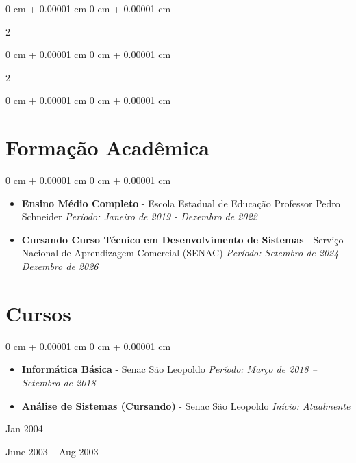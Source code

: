 \documentclass[10pt, letterpaper]{article}
\newenvironment{onecolentry}{
    \begin{adjustwidth}{
        0 cm + 0.00001 cm
    }{
        0 cm + 0.00001 cm
    }
}{
    \end{adjustwidth}
} %
\newenvironment{twocolentry}[2][]{
    \onecolentry
    \def\secondColumn{#2}
    \setcolumnwidth{\fill, 4.5 cm}
    \begin{paracol}{2}
}{
    \switchcolumn \raggedleft \secondColumn
    \end{paracol}
    \endonecolentry
} %
\begin{document}
        \begin{twocolentry}{
            June 2003 – Aug 2003
        }


        \vspace{0.10 cm}



        
        \begin{samepage}
            \begin{twocolentry}{
                Jan 2004
            }
               

            \vspace{0.10 cm}
            
            \begin{onecolentry}

                \vspace{0.10 cm}
                
 \section{Formação Acadêmica}

\begin{onecolentry}
    \begin{itemize}
        \item \textbf{Ensino Médio Completo} - Escola Estadual de Educação Professor Pedro Schneider  
        \textit{Período: Janeiro de 2019 - Dezembro de 2022}
        
        \item \textbf{Cursando Curso Técnico em Desenvolvimento de Sistemas} - Serviço Nacional de Aprendizagem Comercial (SENAC)  
        \textit{Período: Setembro de 2024 - Dezembro de 2026}
    \end{itemize}
\end{onecolentry}


            

\section{Cursos}

\begin{onecolentry}
    \begin{itemize}
        \item \textbf{Informática Básica} - Senac São Leopoldo  
        \textit{Período: Março de 2018 – Setembro de 2018}

        \item \textbf{Análise de Sistemas (Cursando)} - Senac São Leopoldo  
        \textit{Início: Atualmente}
    \end{itemize}
\end{onecolentry}


\end{onecolentry}
\end{twocolentry}
\end{samepage}
\end{twocolentry}
\end{document}
